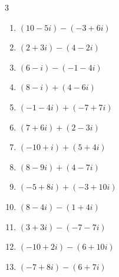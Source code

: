 \begin{multicols}{3}
\begin{enumerate}
        \phantom{$\displaystyle =2-i$}

  \item $\displaystyle (10-5i) - (-3+6i)$

        \phantom{$\displaystyle =13-11i$}

  \item $\displaystyle (2+3i) - (4-2i)$

        \phantom{$\displaystyle =-2+5i$}

  \item $\displaystyle (6-i) - (-1-4i)$

        \phantom{$\displaystyle =7+3i$}

  \item $\displaystyle (8-i) + (4-6i)$

        \phantom{$\displaystyle =12-7i$}

  \item $\displaystyle (-1-4i) + (-7+7i)$

        \phantom{$\displaystyle =-8+3i$}

  \item $\displaystyle (7+6i) + (2-3i)$

        \phantom{$\displaystyle =9+3i$}

  \item $\displaystyle (-10+i) + (5+4i)$

        \phantom{$\displaystyle =-5+5i$}

  \item $\displaystyle (8-9i) + (4-7i)$

        \phantom{$\displaystyle =12-16i$}

  \item $\displaystyle (-5+8i) + (-3+10i)$

        \phantom{$\displaystyle =-8+18i$}

  \item $\displaystyle (8-4i) - (1+4i)$

        \phantom{$\displaystyle =7-8i$}

  \item $\displaystyle (3+3i) - (-7-7i)$

        \phantom{$\displaystyle =10+10i$}

  \item $\displaystyle (-10+2i) - (6+10i)$

        \phantom{$\displaystyle =-16-8i$}

\columnbreak %

  \item $\displaystyle (-7+8i) - (6+7i)$


\end{enumerate}
\end{multicols}
